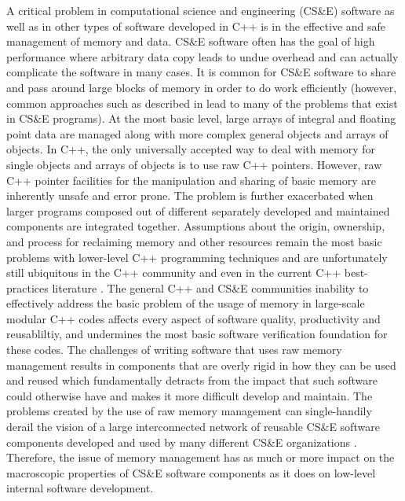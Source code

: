 \documentclass[pdf,ps2pdf,11pt]{SANDreport}
\begin{document}
A critical problem in computational science and engineering (CS\&E)
software as well as in other types of software developed in C++ is in
the effective and safe management of memory and data.  CS\&E software
often has the goal of high performance where arbitrary data copy leads
to undue overhead and can actually complicate the software in many
cases.  It is common for CS\&E software to share and pass around large
blocks of memory in order to do work efficiently (however, common
approaches such as described in
{}\cite{DataSharinginScientificSimulations} lead to many of the
problems that exist in CS\&E programs).  At the most basic level,
large arrays of integral and floating point data are managed along
with more complex general objects and arrays of objects.  In C++, the
only universally accepted way to deal with memory for single objects
and arrays of objects is to use raw C++ pointers.  However, raw C++
pointer facilities for the manipulation and sharing of basic memory
are inherently unsafe and error prone.  The problem is further
exacerbated when larger programs composed out of different separately
developed and maintained components are integrated together.
Assumptions about the origin, ownership, and process for reclaiming
memory and other resources remain the most basic problems with
lower-level C++ programming techniques and are unfortunately still
ubiquitous in the C++ community and even in the current C++
best-practices literature {}\cite{C++CodingStandards05,
EffectiveC++ThirdEdition}.  The general C++ and CS\&E communities
inability to effectively address the basic problem of the usage of
memory in large-scale modular C++ codes affects every aspect of
software quality, productivity and reusabliltiy, and undermines the
most basic software verification foundation for these codes.  The
challenges of writing software that uses raw memory management results
in components that are overly rigid in how they can be used and reused
which fundamentally detracts from the impact that such software could
otherwise have and makes it more difficult develop and maintain.  The
problems created by the use of raw memory management can
single-handily derail the vision of a large interconnected network of
reusable CS\&E software components developed and used by many
different CS\&E organizations {}\cite{HPCNeedsAToolsStrategy05}.
Therefore, the issue of memory management has as much or more impact
on the macroscopic properties of CS\&E software components as it does
on low-level internal software development.
\end{document}
